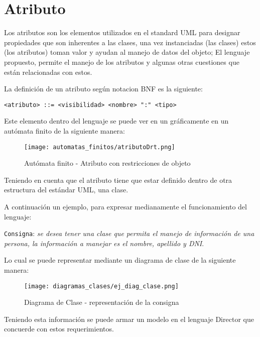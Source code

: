 \section{Atributo}
\label{sec:atributo}

Los atributos son los elementos utilizados en el standard UML para designar
propiedades que son inherentes a las clases, una vez instanciadas (las clases)
estos (los atributos) toman valor y ayudan al manejo de datos del objeto; El
lenguaje propuesto, permite el manejo de los atributos y algunas otras
cuestiones que están relacionadas con estos.

La definición de un atributo según notacion BNF es la siguiente:

\begin{lstlisting}[caption={BNF - Atributo}, basicstyle=\footnotesize\ttfamily]
  <atributo> ::= <visibilidad> <nombre> ":" <tipo>
\end{lstlisting}

Este elemento dentro del lenguaje se puede ver en un gráficamente en
un autómata finito de la siguiente manera:

\begin{figure}[H]
	\centering
	\texttt{[image: automatas\_finitos/atributoDrt.png]}
	\caption{Autómata finito - Atributo con restricciones de objeto}
	\label{fig:af_atr_modif}
\end{figure}

Teniendo en cuenta que el atributo tiene que estar definido dentro de otra
estructura del estándar UML, una clase.

A continuación un ejemplo, para expresar medianamente el funcionamiento del
lenguaje:\\

\begin{displayquote}
	\texttt{Consigna}: \textit{se desea tener una clase que permita el manejo de
	información de una persona, la información a manejar es el nombre, apellido
	y DNI}.
\end{displayquote}

Lo cual se puede representar mediante un diagrama de clase
de la siguiente manera:

\begin{figure}[H]
	\centering
	\texttt{[image: diagramas\_clases/ej\_diag\_clase.png]}
	\caption{Diagrama de Clase - representación de la consigna}
	\label{fig:ej_diag_clase.png}
\end{figure}

Teniendo esta información se puede armar un modelo en el lenguaje Director que
concuerde con estos requerimientos.

